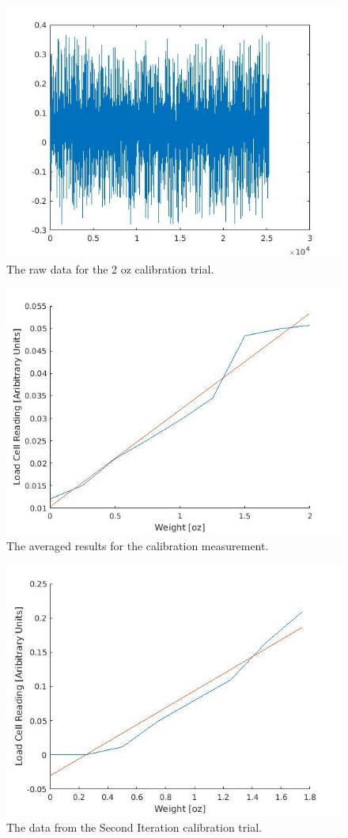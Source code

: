 \documentclass[12pt]{report} %
\begin{document}
\begin{figure}
\includegraphics[width = 0.7\linewidth]{data_example.jpg}
\centering
\caption{The raw data for the 2 oz calibration trial.}
\label{data_example}
\end{figure}

\begin{figure}
\includegraphics[width = 0.7\linewidth]{loadCellCalibration.jpg}
\centering
\caption{The averaged results for the calibration measurement.}
\label{loadCellCalibration}
\end{figure}

\begin{figure}
\includegraphics[width = 0.7\linewidth]{secondIterationCalibrationPlot.jpg}
\centering
\caption{The data from the Second Iteration calibration trial.}
\label{secondIterationCalibrationPlot}
\end{figure}
\end{document}
